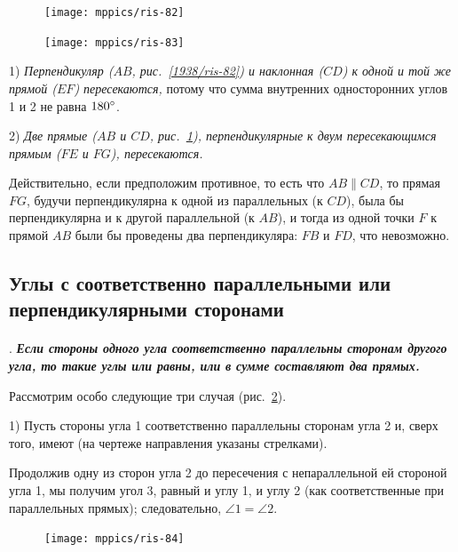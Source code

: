 {

\begin{figure}
\vskip-5mm
\centering
\texttt{[image: mppics/ris-82]}
\caption{}\label{1938/ris-82}
\bigskip
\texttt{[image: mppics/ris-83]}
\caption{}\label{1938/ris-83}
\end{figure}

1) \emph{Перпендикуляр \emph{($AB$, рис.~\ref{1938/ris-82})} и наклонная \emph{($CD$)} к одной и той же прямой \emph{($EF$)} пересекаются,} потому что сумма внутренних односторонних углов 1 и 2 не равна $180\degree$.

2) \emph{Две прямые \emph{($AB$ и $CD$, рис.~\ref{1938/ris-83}),} перпендикулярные к двум пересекающимся прямым \emph{($FE$ и $FG$),} пересекаются.}

Действительно, если предположим противное, то есть
что $AB \parallel CD$, то прямая $FG$, будучи перпендикулярна к одной из параллельных (к $CD$), была бы перпендикулярна и к другой параллельной (к $AB$), и тогда из одной точки $F$ к прямой $AB$ были бы проведены два перпендикуляра:
$FB$ и $FD$, что невозможно.

}

\subsection*{Углы с соответственно параллельными или перпендикулярными сторонами}

\paragraph{}\label{1938/79}
.
\textbf{\emph{Если стороны одного угла соответственно параллельны сторонам другого угла, то такие углы или равны, или в сумме составляют два прямых.}}

Рассмотрим особо следующие три случая (рис.~\ref{1938/ris-84}).

1) Пусть стороны угла 1 соответственно параллельны сторонам угла 2 и, сверх того, имеют  (на чертеже направления указаны стрелками).

Продолжив одну из сторон угла 2 до пересечения с непараллельной ей стороной угла 1, мы получим угол 3, равный и углу 1, и углу 2 (как соответственные при параллельных прямых);
следовательно, $\angle 1 = \angle 2$.

\begin{figure}
\vskip-0mm
\centering
\texttt{[image: mppics/ris-84]}
\caption{}\label{1938/ris-84}
\end{figure}

